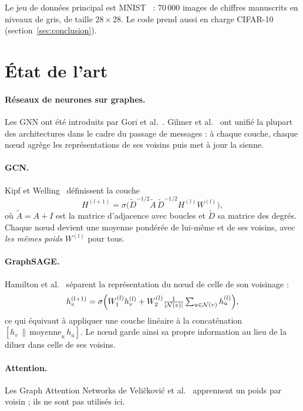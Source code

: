 \documentclass[11pt,a4paper]{article}
\begin{document}
Le jeu de données principal est MNIST~\cite{lecun1998} : 70\,000 images de chiffres manuscrits en niveaux de gris,
de taille $28\times28$. Le code prend aussi en charge CIFAR-10 (section~\ref{sec:conclusion}).

\section{État de l'art}

\paragraph{Réseaux de neurones sur graphes.}
Les GNN ont été introduits par Gori et al.~\cite{gori2005}. Gilmer et al.~\cite{gilmer2017} ont unifié la plupart
des architectures dans le cadre du passage de messages : à chaque couche, chaque nœud agrège les représentations de
ses voisins puis met à jour la sienne.

\paragraph{GCN.} Kipf et Welling~\cite{kipf2017} définissent la couche
\begin{equation}
H^{(l+1)} = \sigma\bigl(\tilde D^{-1/2}\tilde A\,\tilde D^{-1/2} H^{(l)} W^{(l)}\bigr),
\label{eq:gcn}
\end{equation}
où $\tilde A = A + I$ est la matrice d'adjacence avec boucles et $\tilde D$ sa matrice des degrés.
Chaque nœud devient une moyenne pondérée de lui-même et de ses voisins, avec \emph{les mêmes poids} $W^{(l)}$ pour tous.

\paragraph{GraphSAGE.} Hamilton et al.~\cite{hamilton2017} séparent la représentation du nœud de celle de son voisinage :
\begin{equation}
h_v^{(l+1)} = \sigma\Bigl(W_1^{(l)} h_v^{(l)} + W_2^{(l)} \tfrac{1}{|\mathcal N(v)|}\textstyle\sum_{u\in\mathcal N(v)} h_u^{(l)}\Bigr),
\label{eq:sage}
\end{equation}
ce qui équivaut à appliquer une couche linéaire à la concaténation $[h_v \,\|\, \mathrm{moyenne}_{u}\,h_u]$.
Le nœud garde ainsi sa propre information au lieu de la diluer dans celle de ses voisins.

\paragraph{Attention.} Les Graph Attention Networks de Veličković et al.~\cite{velickovic2018} apprennent un poids
par voisin ; ils ne sont pas utilisés ici.
\end{document}
